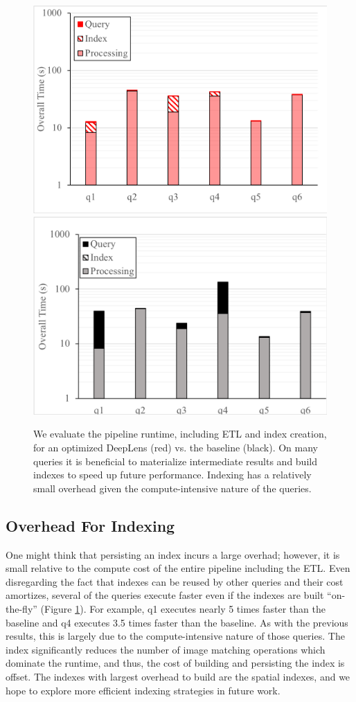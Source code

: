 \begin{figure}[t]
\centering
 \includegraphics[width=0.6\columnwidth]{figures/indexing_a.png}
 \includegraphics[width=0.6\columnwidth]{figures/indexing_b.png}
 \caption{We evaluate the pipeline runtime, including ETL and index creation, for an optimized \textsf{DeepLens} (red) vs. the baseline (black). On many queries it is beneficial to materialize intermediate results and build indexes to speed up future performance. Indexing has a relatively small overhead given the compute-intensive nature of the queries. \label{index} }
\end{figure}

\subsection{Overhead For Indexing}
One might think that persisting an index incurs a large overhad; however, it is small relative to the compute cost of the entire pipeline including the ETL.
Even disregarding the fact that indexes can be reused by other queries and their cost amortizes, several of the queries execute faster even if the indexes are built ``on-the-fly'' (Figure \ref{index}).
For example, q1 executes nearly 5 times faster than the baseline and q4 executes 3.5 times faster than the baseline.
As with the previous results, this is largely due to the compute-intensive nature of those queries.
The index significantly reduces the number of image matching operations which dominate the runtime, and thus, the cost of building and persisting the index is offset.
The indexes with largest overhead to build are the spatial indexes, and we hope to explore more efficient indexing strategies in future work.

